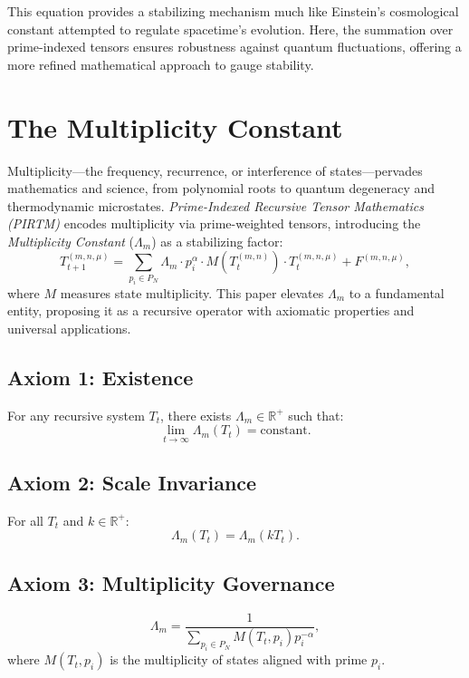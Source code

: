 \documentclass[12]{amsart}
\theoremstyle{plain}
\begin{document}
This equation provides a stabilizing mechanism much like Einstein’s cosmological constant attempted to regulate spacetime’s evolution. Here, the summation over prime-indexed tensors ensures robustness against quantum fluctuations, offering a more refined mathematical approach to gauge stability.

\section{ The Multiplicity Constant}
Multiplicity---the frequency, recurrence, or interference of states---pervades mathematics and science, from polynomial roots to quantum degeneracy and thermodynamic microstates. \textit{Prime-Indexed Recursive Tensor Mathematics (PIRTM)} encodes multiplicity via prime-weighted tensors, introducing the \textit{Multiplicity Constant} ($\Lambda_m$) as a stabilizing factor:
\begin{equation}
T_{t+1}^{(m, n, \mu)} = \sum_{p_i \in P_N} \Lambda_m \cdot p_i^\alpha \cdot M(T_t^{(m, n)}) \cdot T_t^{(m, n, \mu)} + F^{(m, n, \mu)},
\end{equation}
where $M$ measures state multiplicity. This paper elevates $\Lambda_m$ to a fundamental entity, proposing it as a recursive operator with axiomatic properties and universal applications.

\subsection{Axiom 1: Existence}
For any recursive system $T_t$, there exists $\Lambda_m \in \mathbb{R}^+$ such that:
\begin{equation}
\lim_{t \to \infty} \Lambda_m(T_t) = \text{constant}.
\end{equation}
\subsection{Axiom 2: Scale Invariance}
For all $T_t$ and $k \in \mathbb{R}^+$:
\begin{equation}
\Lambda_m(T_t) = \Lambda_m(k T_t).
\end{equation}

\subsection{Axiom 3: Multiplicity Governance}
\begin{equation}
\Lambda_m = \frac{1}{\sum_{p_i \in P_N} M(T_t, p_i) p_i^{-\alpha}},
\end{equation}
where $M(T_t, p_i)$ is the multiplicity of states aligned with prime $p_i$.
\end{document}
